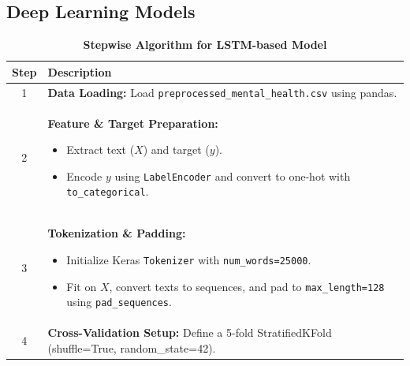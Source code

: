 \subsection{Deep Learning Models}

\begin{table}[H]
    \caption*{\textbf{Stepwise Algorithm for LSTM-based Model}}
    \label{tab:lstm_algorithm}
    \centering
    \renewcommand{\arraystretch}{1.3}
    \small
    \begin{tabularx}{\textwidth}{|c|X|}
        \hline
        \textbf{Step} & \textbf{Description} \\
        \hline
        1 & \textbf{Data Loading:} Load \texttt{preprocessed\_mental\_health.csv} using pandas. \\
        \hline
        2 & \textbf{Feature \& Target Preparation:}  
              \begin{itemize}[noitemsep, topsep=0pt]
                  \item Extract text ($X$) and target ($y$).
                  \item Encode $y$ using \texttt{LabelEncoder} and convert to one-hot with \texttt{to\_categorical}.
              \end{itemize} \\
        \hline
        3 & \textbf{Tokenization \& Padding:}  
              \begin{itemize}[noitemsep, topsep=0pt]
                  \item Initialize Keras \texttt{Tokenizer} with \texttt{num\_words=25000}.
                  \item Fit on $X$, convert texts to sequences, and pad to \texttt{max\_length=128} using \texttt{pad\_sequences}.
              \end{itemize} \\
        \hline
        4 & \textbf{Cross-Validation Setup:} Define a 5-fold StratifiedKFold (shuffle=True, random\_state=42). \\
        \hline
    \end{tabularx}
\end{table}

